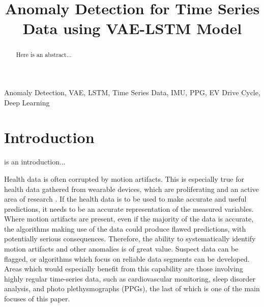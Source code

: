 \documentclass[conference]{IEEEtran}
\begin{document}
\title{Anomaly Detection for Time Series Data using VAE-LSTM Model}

\author{
    \and
    \and
}

\maketitle

\begin{abstract}
Here is an abstract...
\end{abstract}

\begin{IEEEkeywords}
Anomaly Detection, VAE, LSTM, Time Series Data, IMU, PPG, EV Drive Cycle, Deep Learning
\end{IEEEkeywords}

\section{Introduction}
 is an introduction...

Health data is often corrupted by motion artifacts. This is especially true for health data gathered from wearable devices, which are proliferating and an active area of research \cite{conor_ref}. If the health data is to be used to make accurate and useful predictions, it needs to be an accurate representation of the measured variables. Where motion artifacts are present, even if the majority of the data is accurate, the algorithms making use of the data could produce flawed predictions, with potentially serious consequences. Therefore, the ability to systematically identify motion artifacts and other anomalies is of great value. Suspect data can be flagged, or algorithms which focus on reliable data segments can be developed. Areas which would especially benefit from this capability are those involving highly regular time-series data, such as cardiovascular monitoring, sleep disorder analysis, and photo plethysmographs (PPGs), the last of which is one of the main focuses of this paper.
\end{document}
